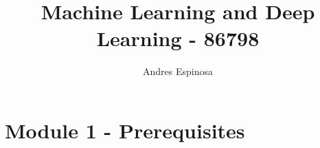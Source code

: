 \documentclass[11pt]{article}
\title{Machine Learning and Deep Learning - 86798}
\author{Andres Espinosa}
\begin{document}
\maketitle

\tableofcontents

\section{Module 1 - Prerequisites}
\end{document}
